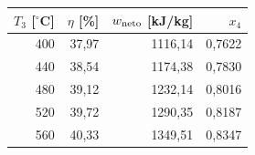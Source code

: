 \begin{tabular}{rrrr}
\toprule
$T_3$ [$^\circ$C] & $\eta$ [\%] & $w_{\rm neto}$ [kJ/kg] & $x_4$\\
\midrule
400 & 37,97 & 1116,14 & 0,7622 \\
440 & 38,54 & 1174,38 & 0,7830 \\
480 & 39,12 & 1232,14 & 0,8016 \\
520 & 39,72 & 1290,35 & 0,8187 \\
560 & 40,33 & 1349,51 & 0,8347 \\
\bottomrule
\end{tabular}
